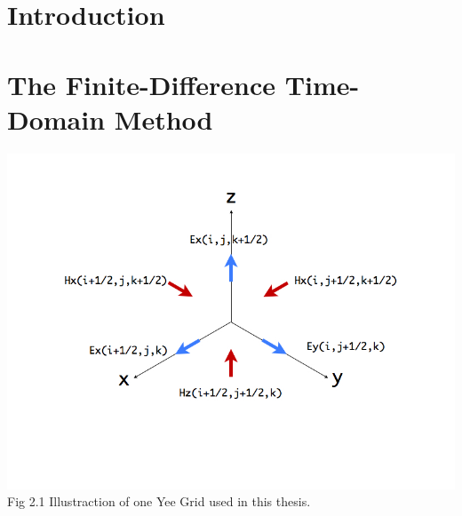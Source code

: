 \documentclass[openany]{book}
\begin{document}
\fontsize{12}{2.0em}\selectfont


\frontmatter




\tableofcontents





\mainmatter

\chapter{Introduction}




\chapter{The Finite-Difference Time-Domain Method}





\clearpage
\begin{center}
\includegraphics[scale=0.5]{images/yee-grid.jpg}\\
Fig 2.1
Illustraction of one Yee Grid used in this thesis.
\end{center}
\end{document}

